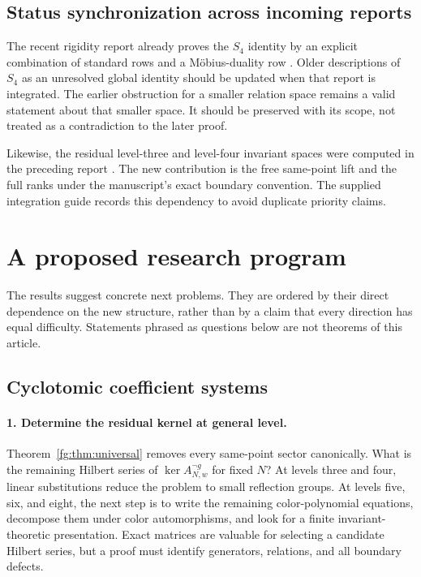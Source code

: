 \documentclass[11pt,a4paper]{article}
\theoremstyle{definition}
\theoremstyle{remark}
\numberwithin{equation}{section}
\begin{document}
\subsection{Status synchronization across incoming reports}

The recent rigidity report already proves the $S_4$ identity by an
explicit combination of standard rows and a Möbius-duality row
\cite{PriorRigidity}. Older descriptions of $S_4$ as an unresolved
global identity should be updated when that report is integrated.
The earlier obstruction for a smaller relation space remains a valid
statement about that smaller space. It should be preserved with its
scope, not treated as a contradiction to the later proof.

Likewise, the residual level-three and level-four invariant spaces
were computed in the preceding report \cite{PriorResearch}. The
new contribution is the free same-point lift and the full ranks under
the manuscript's exact boundary convention. The supplied integration
guide records this dependency to avoid duplicate priority claims.
\section{A proposed research program}
\label{research:sec:program}

The results suggest concrete next problems. They are ordered by their
direct dependence on the new structure, rather than by a claim that
every direction has equal difficulty. Statements phrased as questions
below are not theorems of this article.

\subsection{Cyclotomic coefficient systems}

\paragraph{1. Determine the residual kernel at general level.}
Theorem~\ref{fg:thm:universal} removes every same-point sector
canonically. What is the remaining Hilbert series of
$\ker A_{N,w}^{\neg g}$ for fixed $N$? At levels three and four,
linear substitutions reduce the problem to small reflection groups.
At levels five, six, and eight, the next step is to write the remaining
color-polynomial equations, decompose them under color automorphisms,
and look for a finite invariant-theoretic presentation. Exact matrices
are valuable for selecting a candidate Hilbert series, but a proof
must identify generators, relations, and all boundary defects.
\end{document}
